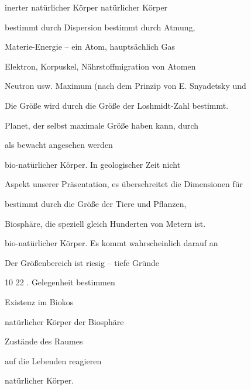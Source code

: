 \documentclass[11pt,a4paper]{book}
\begin{document}
inerter natürlicher Körper natürlicher Körper



bestimmt durch Dispersion bestimmt durch Atmung,



Materie-Energie -- ein Atom, hauptsächlich Gas



Elektron, Korpuskel, Nährstoffmigration von Atomen



Neutron usw. Maximum (nach dem Prinzip von E. Snyadetsky und



Die Größe wird durch die Größe der Loshmidt-Zahl bestimmt.



Planet, der selbst maximale Größe haben kann, durch



als bewacht angesehen werden



bio-natürlicher Körper. In geologischer Zeit nicht



Aspekt unserer Präsentation, es überschreitet die Dimensionen für



bestimmt durch die Größe der Tiere und Pflanzen,



Biosphäre, die speziell gleich Hunderten von Metern ist.



bio-natürlicher Körper. Es kommt wahrscheinlich darauf an



Der Größenbereich ist riesig -- tiefe Gründe



10 22 . Gelegenheit bestimmen



                                   Existenz im Biokos



                                   natürlicher Körper der Biosphäre



                                   Zustände des Raumes



                                   auf die Lebenden reagieren



                                   natürlicher Körper.
\end{document}
